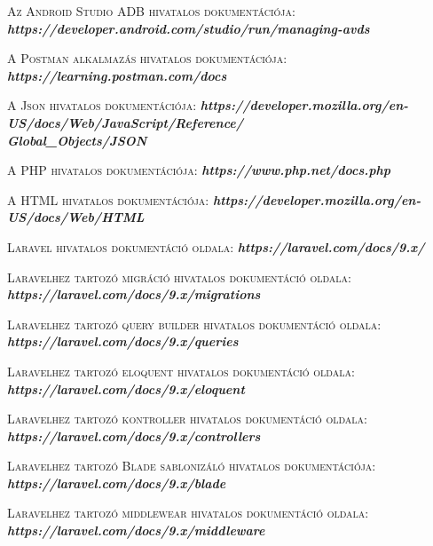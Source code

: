 \documentclass[
]{thesis-ekf}
\theoremstyle{definition}
\theoremstyle{remark}
\begin{document}
\begin{thebibliography}{2}
\textsc{Az Android Studio ADB hivatalos dokumentációja:}
\newline
\emph{\bf{https://developer.android.com/studio/run/managing-avds}}

\textsc{A Postman alkalmazás hivatalos dokumentációja:}
\newline
\emph{\bf{https://learning.postman.com/docs}}

\textsc{A Json hivatalos dokumentációja:}
\newline
\emph{\bf{https://developer.mozilla.org/en-US/docs/Web/JavaScript/Reference/\\Global\_Objects/JSON}}

\textsc{A PHP hivatalos dokumentációja:}
\newline
\emph{\bf{https://www.php.net/docs.php}}

\textsc{A HTML hivatalos dokumentációja:}
\newline
\emph{\bf{https://developer.mozilla.org/en-US/docs/Web/HTML}}

\textsc{Laravel hivatalos dokumentáció oldala:}
\newline
\emph{\bf{https://laravel.com/docs/9.x/}}

\textsc{Laravelhez tartozó migráció hivatalos dokumentáció oldala:}
\newline
\emph{\bf{https://laravel.com/docs/9.x/migrations}}

\textsc{Laravelhez tartozó query builder hivatalos dokumentáció oldala:}
\newline
\emph{\bf{https://laravel.com/docs/9.x/queries}}

\textsc{Laravelhez tartozó eloquent hivatalos dokumentáció oldala:}
\newline
\emph{\bf{https://laravel.com/docs/9.x/eloquent}}

\textsc{Laravelhez tartozó kontroller hivatalos dokumentáció oldala:}
\newline
\emph{\bf{https://laravel.com/docs/9.x/controllers}}

\textsc{Laravelhez tartozó Blade sablonizáló hivatalos dokumentációja:}
\newline
\emph{\bf{https://laravel.com/docs/9.x/blade}}

\textsc{Laravelhez tartozó middlewear hivatalos dokumentáció oldala:}
\newline
\emph{\bf{https://laravel.com/docs/9.x/middleware}}


\end{thebibliography}
\end{document}
